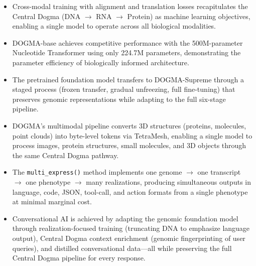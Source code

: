{\begin{itemize}[leftmargin=1.5em]
  \item Cross-modal training with alignment and translation losses recapitulates the Central Dogma (DNA $\to$ RNA $\to$ Protein) as machine learning objectives, enabling a single model to operate across all biological modalities.
  \item DOGMA-base achieves competitive performance with the 500M-parameter Nucleotide Transformer using only 224.7M parameters, demonstrating the parameter efficiency of biologically informed architecture.
  \item The pretrained foundation model transfers to DOGMA-Supreme through a staged process (frozen transfer, gradual unfreezing, full fine-tuning) that preserves genomic representations while adapting to the full six-stage pipeline.
  \item DOGMA's multimodal pipeline converts 3D structures (proteins, molecules, point clouds) into byte-level tokens via TetraMesh, enabling a single model to process images, protein structures, small molecules, and 3D objects through the same Central Dogma pathway.
  \item The \texttt{multi\_express()} method implements one genome $\to$ one transcript $\to$ one phenotype $\to$ many realizations, producing simultaneous outputs in language, code, JSON, tool-call, and action formats from a single phenotype at minimal marginal cost.
  \item Conversational AI is achieved by adapting the genomic foundation model through realization-focused training (truncating DNA to emphasize language output), Central Dogma context enrichment (genomic fingerprinting of user queries), and distilled conversational data---all while preserving the full Central Dogma pipeline for every response.
\end{itemize}
}

